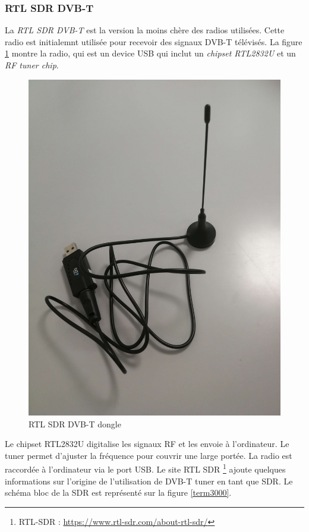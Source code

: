 \newpage

\subsubsection{RTL SDR DVB-T}\label{dvbt}

La \textit{RTL SDR DVB-T} est la version la moins chère des radios utilisées. Cette radio est initialemnt utilisée pour recevoir des signaux \ac{DVB-T} télévisés. La figure \ref{term31} montre la radio, qui est un device \ac{USB} qui inclut un \textit{chipset RTL2832U} et un \textit{RF tuner chip}.

\begin{figure}[h]
\centering

\includegraphics[scale=0.08]{images/dvbt.png}
\caption{RTL SDR DVB-T dongle}\label{term31}
\end{figure}

Le chipset RTL2832U digitalise les signaux RF et les envoie à l'ordinateur. Le tuner permet d'ajuster la fréquence pour couvrir une large portée.
La radio est raccordée à l'ordinateur via le port \ac{USB}. Le site RTL SDR \footnote{RTL-SDR : \href{https://www.rtl-sdr.com/about-rtl-sdr/}{https://www.rtl-sdr.com/about-rtl-sdr/}} ajoute quelques informations sur l'origine de l'utilisation de \ac{DVB-T} tuner en tant que \ac{SDR}. Le schéma bloc de la \ac{SDR} est représenté sur la figure \ref{term3000}. 

